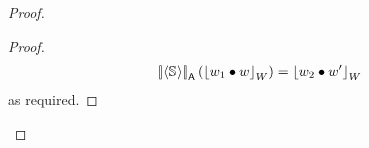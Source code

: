 \begin{theorem}
\begin{proof}
\begin{proof}
%
\begin{align*}
	\left[\!\left| \left\langle \mathbb{S}_{} \right\rangle \right |\! \right]_{\textsf{A}}\left( \left\lfloor w_1 \bullet w \right\rfloor_{W} \right) = \left\lfloor w_2 \bullet w' \right\rfloor_{W}
\end{align*}
%
as required.\vspace{-10pt}
%	
%	
%	
%	
%
%	
%	
%	

\end{proof}
\end{proof}
\end{theorem}
